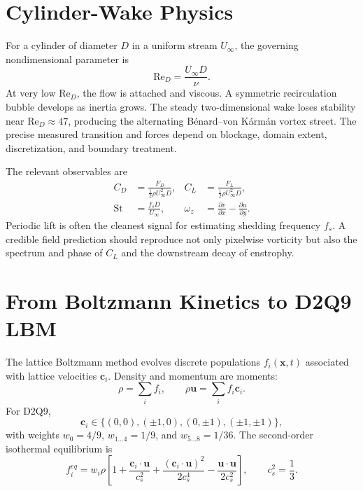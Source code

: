 \documentclass[11pt]{article}
\newcommand{\Rey}{\mathrm{Re}}
\newcommand{\St}{\mathrm{St}}
\begin{document}
\section{Cylinder-Wake Physics}
For a cylinder of diameter $D$ in a uniform stream $U_\infty$, the governing nondimensional parameter is
\begin{equation}
\Rey_D=\frac{U_\infty D}{\nu}.
\end{equation}
At very low $\Rey_D$, the flow is attached and viscous. A symmetric recirculation bubble develops as inertia grows. The steady two-dimensional wake loses stability near $\Rey_D\approx47$, producing the alternating B\'enard--von K\'arm\'an vortex street. The precise measured transition and forces depend on blockage, domain extent, discretization, and boundary treatment.

The relevant observables are
\begin{align}
C_D &= \frac{F_D}{\tfrac12\rho U_\infty^2D}, &
C_L &= \frac{F_L}{\tfrac12\rho U_\infty^2D},\\
\St &= \frac{f_sD}{U_\infty}, &
\omega_z &= \frac{\partial v}{\partial x}-\frac{\partial u}{\partial y}.
\end{align}
Periodic lift is often the cleanest signal for estimating shedding frequency $f_s$. A credible field prediction should reproduce not only pixelwise vorticity but also the spectrum and phase of $C_L$ and the downstream decay of enstrophy.

\section{From Boltzmann Kinetics to D2Q9 LBM}
The lattice Boltzmann method evolves discrete populations $f_i(\bm{x},t)$ associated with lattice velocities $\bm{c}_i$. Density and momentum are moments:
\begin{equation}
\rho=\sum_i f_i,\qquad \rho\bm{u}=\sum_i f_i\bm{c}_i.
\end{equation}
For D2Q9,
\begin{equation}
\bm{c}_i\in\{(0,0),(\pm1,0),(0,\pm1),(\pm1,\pm1)\},
\end{equation}
with weights $w_0=4/9$, $w_{1\ldots4}=1/9$, and $w_{5\ldots8}=1/36$. The second-order isothermal equilibrium is
\begin{equation}
f_i^{eq}=w_i\rho\left[1+\frac{\bm{c}_i\cdot\bm{u}}{c_s^2}
+\frac{(\bm{c}_i\cdot\bm{u})^2}{2c_s^4}-\frac{\bm{u}\cdot\bm{u}}{2c_s^2}\right],
\qquad c_s^2=\frac13.
\end{equation}
\end{document}
